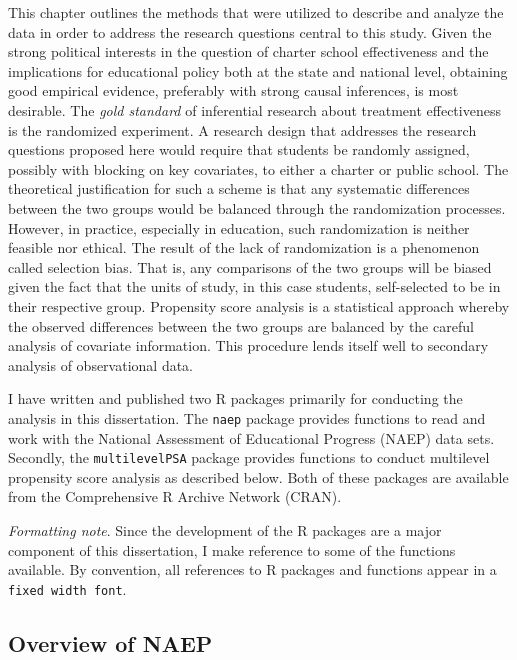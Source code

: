 \documentclass[letterpaper,12p,twoside]{article} %
\begin{document}
This chapter outlines the methods that were utilized to describe and analyze the data in order to address the research questions central to this study. Given the strong political interests in the question of charter school effectiveness and the implications for educational policy both at the state and national level, obtaining good empirical evidence, preferably with strong causal inferences, is most desirable. The \textit{gold standard} of inferential research about treatment effectiveness is the randomized experiment. A research design that addresses the research questions proposed here would require that students be randomly assigned, possibly with blocking on key covariates, to either a charter or public school. The theoretical justification for such a scheme is that any systematic differences between the two groups would be balanced through the randomization processes. However, in practice, especially in education, such randomization is neither feasible nor ethical. The result of the lack of randomization is a phenomenon called selection bias. That is, any comparisons of the two groups will be biased given the fact that the units of study, in this case students, self-selected to be in their respective group. Propensity score analysis \cite{RosenbaumRubin1983} is a statistical approach whereby the observed differences between the two groups are balanced by the careful analysis of covariate information. This procedure lends itself well to secondary analysis of observational data.

I have written and published two R packages primarily for conducting the analysis in this dissertation. The \texttt{naep} package provides functions to read and work with the National Assessment of Educational Progress (NAEP) data sets. Secondly, the \texttt{multilevelPSA} package provides functions to conduct multilevel propensity score analysis as described below. Both of these packages are available from the Comprehensive R Archive Network (CRAN). 

\textit{Formatting note}. Since the development of the R packages are a major component of this dissertation, I make reference to some of the functions available. By convention, all references to R packages and functions appear in a \texttt{fixed width font}.

\subsection{Overview of NAEP}
\end{document}
